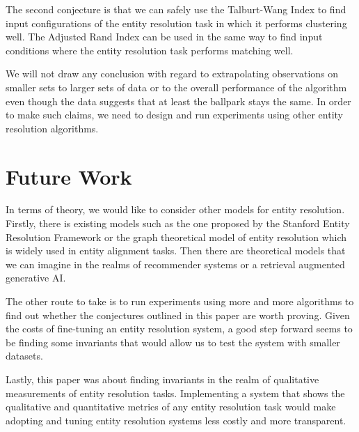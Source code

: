 \documentclass[journal]{IEEEtran}
\begin{document}
    The second conjecture is that we can safely use the Talburt-Wang Index to
    find input configurations of the entity resolution task in which it performs
    clustering well.
    The Adjusted Rand Index can be used in the same way to find input conditions
    where the entity resolution task performs matching well.

    We will not draw any conclusion with regard to extrapolating observations on
    smaller sets to larger sets of data or to the overall performance of the
    algorithm even though the data suggests that at least the ballpark stays the
    same.
    In order to make such claims, we need to design and run experiments using
    other entity resolution algorithms.

    \section[future]{Future Work}\label{sec:future}

    In terms of theory, we would like to consider other models for entity
    resolution.
    Firstly, there is existing models such as the one proposed by the Stanford
    Entity Resolution Framework\cite{Ben2009Swoosh} or the graph theoretical
    model of entity resolution which is widely used in entity alignment tasks.
    Then there are theoretical models that we can imagine in the realms of
    recommender systems or a retrieval augmented generative AI.

    The other route to take is to run experiments using more and more algorithms
    to find out whether the conjectures outlined in this paper are worth proving.
    Given the costs of fine-tuning an entity resolution system, a good step
    forward seems to be finding some invariants that would allow us to test
    the system with smaller datasets.

    Lastly, this paper was about finding invariants in the realm of qualitative
    measurements of entity resolution tasks.
    Implementing a system that shows the qualitative and quantitative metrics
    of any entity resolution task would make adopting and tuning entity
    resolution systems less costly and more transparent.
\end{document}

